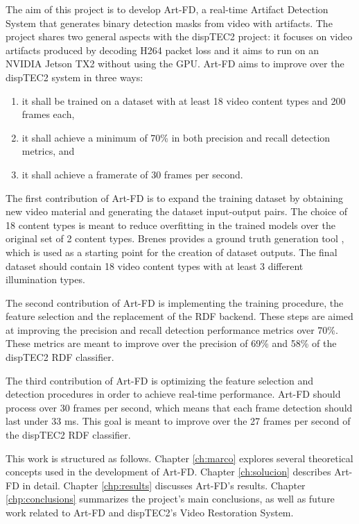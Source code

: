 The aim of this project is to develop Art-FD, a real-time Artifact Detection System that generates binary detection masks from video with artifacts. The project shares two general aspects with the dispTEC2 project: it focuses on video artifacts produced by decoding H264 packet loss and it aims to run on an NVIDIA Jetson TX2 without using the GPU. Art-FD aims to improve over the dispTEC2 system in three ways:

\begin{enumerate}
  \item it shall be trained on a dataset with at least 18 video content types and 200 frames each,
  \item it shall achieve a minimum of 70\% in both precision and recall detection metrics, and
  \item it shall achieve a framerate of 30 frames per second.
\end{enumerate}

The first contribution of Art-FD is to expand the training dataset by obtaining new video material and generating the dataset input-output pairs. The choice of 18 content types is meant to reduce overfitting in the trained models over the original set of 2 content types. Brenes provides a ground truth generation tool \cite{Brenes2022}, which is used as a starting point for the creation of dataset outputs. The final dataset should contain 18 video content types with at least 3 different illumination types.

The second contribution of Art-FD is implementing the training procedure, the feature selection and the replacement of the RDF backend. These steps are aimed at improving the precision and recall detection performance metrics over 70\%. These metrics are meant to improve over the precision of 69\% and 58\% of the dispTEC2 RDF classifier.

The third contribution of Art-FD is optimizing the feature selection and detection procedures in order to achieve real-time performance. Art-FD should process over 30 frames per second, which means that each frame detection should last under 33 ms. This goal is meant to improve over the 27 frames per second of the dispTEC2 RDF classifier.

This work is structured as follows. Chapter \ref{ch:marco} explores several theoretical concepts used in the development of Art-FD. Chapter \ref{ch:solucion} describes Art-FD in detail. Chapter \ref{chp:results} discusses Art-FD's results. Chapter \ref{chp:conclusions} summarizes the project's main conclusions, as well as future work related to Art-FD and dispTEC2's Video Restoration System.
